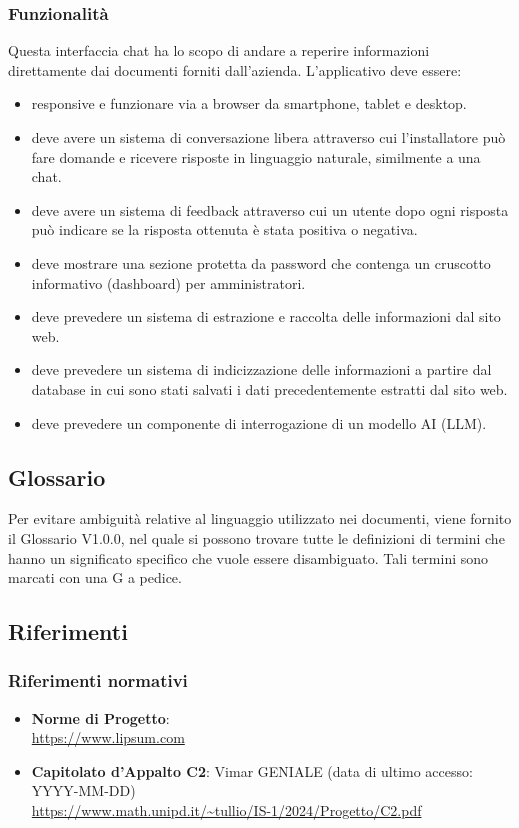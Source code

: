 \subsubsection{Funzionalità}
Questa interfaccia chat ha lo scopo di andare a reperire informazioni direttamente dai documenti forniti dall'azienda. L'applicativo deve essere: 
\begin{itemize}
    \item responsive e funzionare via a browser da smartphone, tablet e
    desktop.
    \item deve avere un sistema di conversazione libera attraverso cui l’installatore può
    fare domande e ricevere risposte in linguaggio naturale, similmente a una chat.
    \item deve avere un sistema di feedback attraverso cui un utente dopo ogni
    risposta può indicare se la risposta ottenuta è stata positiva o negativa.
    \item deve mostrare una sezione protetta da password che contenga un cruscotto
    informativo (dashboard) per amministratori.
    \item  deve prevedere un sistema di estrazione e raccolta delle informazioni dal sito
    web.
    \item deve prevedere un sistema di indicizzazione delle informazioni a partire dal
    database in cui sono stati salvati i dati precedentemente estratti dal sito web.
    \item deve prevedere un componente di interrogazione di un modello AI (LLM).
\end{itemize}

\subsection{Glossario}
Per evitare ambiguità relative al linguaggio utilizzato nei documenti, viene fornito il Glossario V1.0.0, nel quale si possono trovare tutte le definizioni di termini che hanno un significato specifico che vuole essere disambiguato. Tali termini sono marcati con una G a pedice.
\subsection{Riferimenti}
\subsubsection{Riferimenti  normativi}  
\begin{itemize}
    \item \textbf{Norme di Progetto}:\\
    \url{https://www.lipsum.com} 

    \item \textbf{Capitolato d'Appalto C2}: Vimar GENIALE (data di ultimo accesso: YYYY-MM-DD)\\
    \url{https://www.math.unipd.it/~tullio/IS-1/2024/Progetto/C2.pdf}
\end{itemize}
